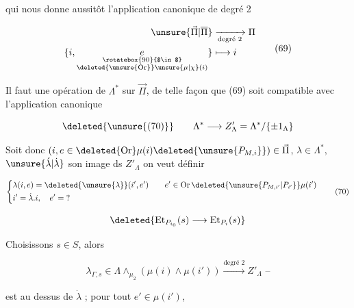 
 qui nous donne aussitôt l'application canonique de degré 2

\[
\begin{aligned}
 \unsure{\vec\Pi|\overline\Pi}&\xrightarrow[\text{degré 2}]{}\Pi\\
 \{i,\underset{\substack{\rotatebox{90}{$\in$}\\\deleted{\unsure{\operatorname{Or}}}\unsure{\mu|\chi}(i)}}e\}&\longmapsto i
\end{aligned}\tag*{(69)}
\]

Il faut  une opération de $\Lambda^*$ sur $\vec\Pi$, de telle façon que (69) soit compatible avec l'application canonique

\[
\deleted{\unsure{(70)}}\qquad\Lambda^*\longrightarrow Z'_\Lambda=\Lambda^*/\{\pm1_\Lambda\}
\]

Soit donc $(i,e\in\deleted{\operatorname{Or}}\mu(i)\deleted{\unsure{P_{M,i}}})\in\vec\Pi$, $\lambda\in\Lambda^*$, $\unsure{\acute\lambda|\dot\lambda}$ son image ds $Z'_\Lambda$ on veut définir

\[
\left\{\begin{aligned}
 &\lambda(i,e)=\deleted{\unsure{\lambda}}(i',e')\qquad e'\in\operatorname{Or}\deleted{\unsure{P_{M,i'}|P_{i'}}}\mu(i')\\
 &i'=\dot\lambda.i,\quad e'=\mathord{?}
\end{aligned}\right.\tag*{(70)}
\]


\[
\deleted{\operatorname{Et}_{P_{i_0}}(s)\longrightarrow\operatorname{Et}_{P_i}(s)}
\]


Choisissons $s\in S$, alors

\[
\lambda_{\Gamma,s}\in\Lambda\wedge_{\mu_2}(\mu(i)\wedge\mu(i'))\xrightarrow{\text{degré 2}} Z'_\Lambda\text{ --}
\]

est au dessus de $\dot\lambda$ ; pour tout $e'\in\mu(i')$,
